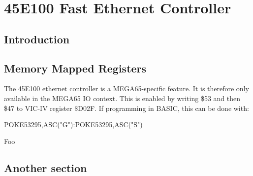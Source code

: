 \chapter{45E100 Fast Ethernet Controller}

\section{Introduction}

\section{Memory Mapped Registers}

The 45E100 ethernet controller is a MEGA65-specific feature.
It is therefore only available in the MEGA65 IO context.
This is enabled by writing \$53 and then \$47 to VIC-IV register \$D02F.
If programming in BASIC, this can be done with:

\begin{screenoutput}
POKE53295,ASC("G"):POKE53295,ASC("S")
\end{screenoutput}



 Foo

 \section{Another section}
